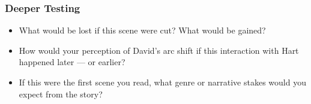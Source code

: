 \subsubsection*{Deeper Testing}

\begin{itemize}
  \item What would be lost if this scene were cut? What would be gained?
  \item How would your perception of David’s arc shift if this interaction with Hart happened later — or earlier?
  \item If this were the first scene you read, what genre or narrative stakes would you expect from the story?
\end{itemize}

